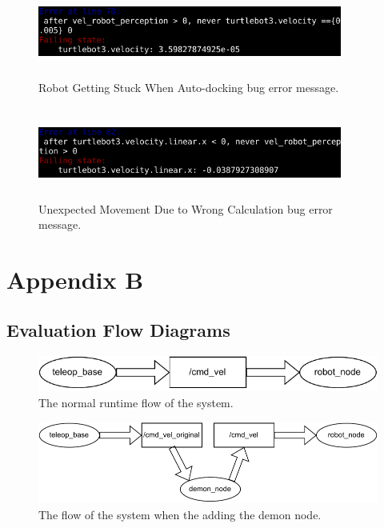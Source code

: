 \begin{figure}
\begin{center}
\includegraphics[width=10cm,height=3cm,keepaspectratio,]{images/erreval2.png}
\caption{Robot Getting Stuck When Auto-docking bug error message.}
\end{center}
\end{figure}

\begin{figure}
\begin{center}
\includegraphics[width=10cm,height=3cm,keepaspectratio,]{images/erreval3.png}
\caption{Unexpected Movement Due to Wrong Calculation bug error message.}
\end{center}
\end{figure}


\chapter*{Appendix B}
\label{app:appendix-B}

\section{Evaluation Flow Diagrams}

\begin{figure}
\includegraphics[width=\textwidth]{images/normal_flow.pdf}
\caption{The normal runtime flow of the system.}
\end{figure}
       
\begin{figure}
\includegraphics[width=\textwidth]{images/demon_flow.pdf}
\caption{The flow of the system when the adding the demon node.}
\end{figure}
